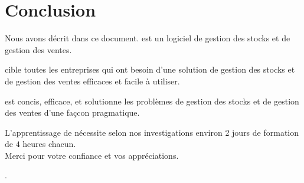 \chapter{Conclusion}\label{chap:conclusion}

Nous avons d\'ecrit \yeroth dans ce document. 
\yeroth est un logiciel de gestion des stocks
et de gestion des ventes.

\yeroth cible toutes les entreprises qui ont besoin
d'une solution de gestion des stocks et de gestion
des ventes efficaces et facile \`a utiliser.

\yeroth est concis, efficace, et solutionne
les probl\`emes de gestion des stocks et
de gestion des ventes d'une fa\c{c}con
pragmatique.

L'apprentissage de \yeroth n\'ecessite selon nos 
investigations environ 2 jours de formation
de $4$ heures chacun.\\

Merci pour votre confiance et vos appr\'eciations.

\textbf{\emph{\myfullacademicname}}.